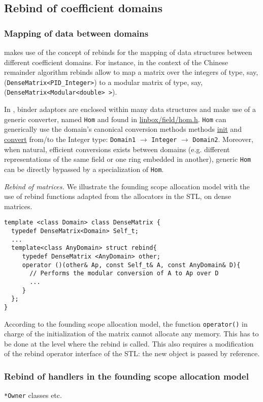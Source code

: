 \subsection{Rebind of coefficient domains}
\subsubsection{Mapping of data between domains}
\linbox makes use of the concept of rebinds for the mapping of data
structures between different coefficient domains.
For instance, in the context of the Chinese remainder algorithm rebinds
allow to map a matrix over the integers of type, say,
(\texttt{DenseMatrix<PID\_Integer>}) to a modular matrix of type, say,
\\(\texttt{DenseMatrix<Modular<double> >}).

In \linbox, binder adaptors are enclosed
within many data structures and make use of a generic
converter, named \texttt{Hom} and found in \url{linbox/field/hom.h}.
\texttt{Hom} can generically use the \linbox domain's canonical
conversion methods methods \url{init} and \url{convert} from/to the \linbox
Integer type: \texttt{Domain1} $\rightarrow$ \texttt{Integer}
$\rightarrow$ \texttt{Domain2}. 
Moreover, when natural, efficient conversions exists between domains
(e.g. different representations of the same field or one ring embedded in another), generic \texttt{Hom} can be directly bypassed by a specialization of \texttt{Hom}.


\begin{paragraph}
{\em Rebind of matrices.}
We illustrate the founding scope allocation model with the use of rebind
functions adapted from the allocators in the STL, on dense matrices.
\begin{verbatim}
template <class Domain> class DenseMatrix {
  typedef DenseMatrix<Domain> Self_t;
  ... 
  template<class AnyDomain> struct rebind{ 
     typedef DenseMatrix <AnyDomain> other;
     operator ()(other& Ap, const Self_t& A, const AnyDomain& D){
       // Performs the modular conversion of A to Ap over D
       ...
     } 
  };  
}
\end{verbatim}
According to the founding scope allocation model, the function
\texttt{operator()} in charge of the initialization of the matrix cannot 
allocate any memory. This has to be done at the level where the
rebind is called. This also requires a modification of the rebind
operator interface of the STL: the new object is passed by reference.

\end{paragraph}

\subsubsection{Rebind of handlers in the founding scope allocation model}

\verb!*Owner! classes etc.


